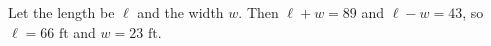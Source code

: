 Let the length be $\ell$ and the width $w$. Then $\ell+w=89$ and $\ell-w=43$, so $\ell=\boxed{66\text{ ft}}$ and $w=\boxed{23\text{ ft}}$.
